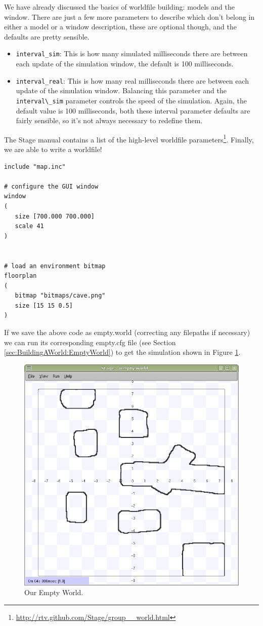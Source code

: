 \documentclass[a4paper]{report}
\begin{document}
We have already discussed the basics of worldfile building: models and the window. There are just a few more parameters to describe which don't belong in either a model or a window description, these are optional though, and the defaults are pretty sensible.
\begin{itemize}
\item \verb|interval_sim|: This is how many simulated milliseconds there are between each update of the simulation window, the default is 100 milliseconds.
\item \verb|interval_real|: This is how many real milliseconds there are between each update of the simulation window. Balancing this parameter and the \verb|interval\_sim| parameter controls the speed of the simulation. Again, the default value is 100 milliseconds, both these interval parameter defaults are fairly sensible, so it's not always necessary to redefine them.
\end{itemize}
The Stage manual contains a list of the high-level worldfile parameters\footnote{\url{http://rtv.github.com/Stage/group__world.html}}.\newline
Finally, we are able to write a worldfile!
\begin{verbatim}
include "map.inc"

# configure the GUI window
window
( 
   size [700.000 700.000] 
   scale 41
)


# load an environment bitmap
floorplan
(
   bitmap "bitmaps/cave.png" 
   size [15 15 0.5]
)
\end{verbatim}
If we save the above code as empty.world (correcting any filepaths if necessary) we can run its corresponding empty.cfg file (see Section \ref{sec:BuildingAWorld:EmptyWorld}) to get the simulation shown in Figure \ref{fig:BuildingAWorld:EmptyWorld:BasicWorldfile:FinalEmptyWorld}.

\begin{figure}
	\centering
	\includegraphics[width=0.7\linewidth]{./pics/empty_world/finalEmptyWorld.png} 
	\caption{Our Empty World.}
	\label{fig:BuildingAWorld:EmptyWorld:BasicWorldfile:FinalEmptyWorld}
\end{figure}
\end{document}
